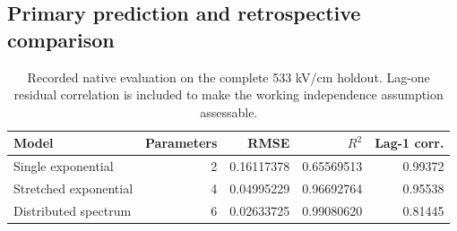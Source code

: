 \documentclass[11pt,a4paper]{article}
\begin{document}
\subsection{Primary prediction and retrospective comparison}

\begin{table}[htbp]\centering\small
\caption{Recorded native evaluation on the complete 533 kV/cm holdout. Lag-one residual correlation is included to make the working independence assumption assessable.}
\label{tab:holdout}
\begin{tabular}{lrrrr}
\toprule
Model & Parameters & RMSE & $R^2$ & Lag-1 corr. \\
\midrule
Single exponential & 2 & 0.16117378 & 0.65569513 & 0.99372 \\
Stretched exponential & 4 & 0.04995229 & 0.96692764 & 0.95538 \\
Distributed spectrum & 6 & 0.02633725 & 0.99080620 & 0.81445 \\
\bottomrule
\end{tabular}
\end{table}
\end{document}
